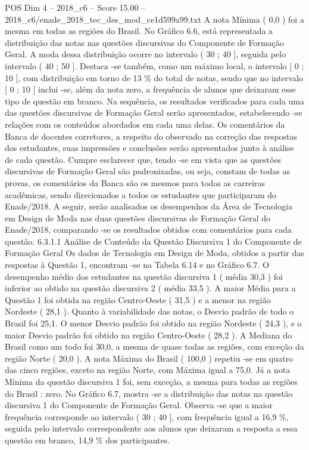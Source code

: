 \begin{textsample}{POS Dim 4 – 2018\_c6 – Score 15.00 – 2018\_c6/enade\_2018\_tec\_des\_mod\_ce1d599a99.txt}
A nota Mínima ( 0,0 ) foi a mesma em todas as regiões do Brasil.
No Gráfico 6.6, está representada a distribuição das notas nas questões discursivas do Componente de Formação Geral.
A moda dessa distribuição ocorre no intervalo ( 30 ; 40 ], seguida pelo intervalo ( 40 ; 50 ].
Destaca -se também, como um máximo local, o intervalo [ 0 ; 10 ], com distribuição em torno de 13 \% do total de notas, sendo que no intervalo [ 0 ; 10 ] inclui -se, além da nota zero, a frequência de alunos que deixaram esse tipo de questão em branco.
Na sequência, os resultados verificados para cada uma das questões discursivas de Formação Geral serão apresentados, estabelecendo -se relações com os conteúdos abordados em cada uma delas.
Os comentários da Banca de docentes corretores, a respeito do observado na correção das respostas dos estudantes, suas impressões e conclusões serão apresentados junto à análise de cada questão.
Cumpre esclarecer que, tendo -se em vista que as questões discursivas de Formação Geral são padronizadas, ou seja, constam de todas as provas, os comentários da Banca são os mesmos para todas as carreiras acadêmicas, sendo direcionados a todos os estudantes que participaram do Enade/2018.
A seguir, serão analisados os desempenhos da Área de Tecnologia em Design de Moda nas duas questões discursivas de Formação Geral do Enade/2018, comparando -se os resultados obtidos com comentários para cada questão. 6.3.1.1 Análise de Conteúdo da Questão Discursiva 1 do Componente de Formação Geral Os dados de Tecnologia em Design de Moda, obtidos a partir das respostas à Questão 1, encontram -se na Tabela 6.14 e no Gráfico 6.7.
O desempenho médio dos estudantes na questão discursiva 1 ( média 30,3 ) foi inferior ao obtido na questão discursiva 2 ( média 33,5 ).
A maior Média para a Questão 1 foi obtida na região Centro-Oeste ( 31,5 ) e a menor na região Nordeste ( 28,1 ).
Quanto à variabilidade das notas, o Desvio padrão de todo o Brasil foi 25,1.
O menor Desvio padrão foi obtido na região Nordeste ( 24,3 ), e o maior Desvio padrão foi obtido na região Centro-Oeste ( 28,2 ).
A Mediana do Brasil como um todo foi 30,0, a mesma de quase todas as regiões, com exceção da região Norte ( 20,0 ).
A nota Máxima do Brasil ( 100,0 ) repetiu -se em quatro das cinco regiões, exceto na região Norte, com Máxima igual a 75,0.
Já a nota Mínima da questão discursiva 1 foi, sem exceção, a mesma para todas as regiões do Brasil : zero.
No Gráfico 6.7, mostra -se a distribuição das notas na questão discursiva 1 do Componente de Formação Geral.
Observa -se que a maior frequência corresponde ao intervalo ( 30 ; 40 ], com frequência igual a 16,9 \%, seguida pelo intervalo correspondente aos alunos que deixaram a resposta a essa questão em branco, 14,9 \% dos participantes.

\end{textsample}
